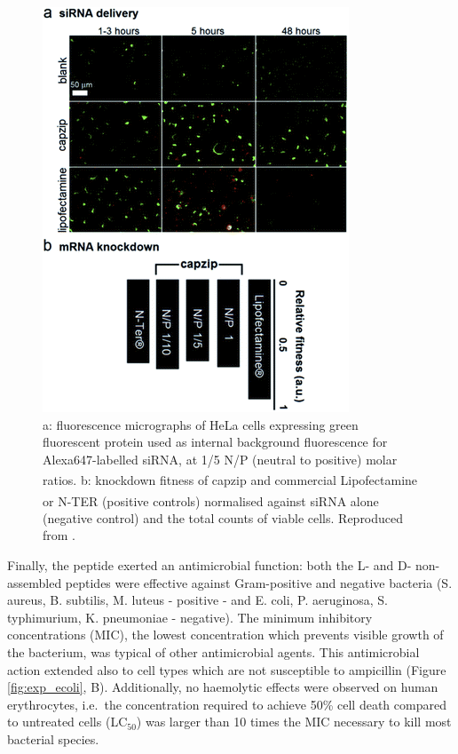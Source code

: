 \begin{figure}
\begin{center}
\includegraphics[width=0.6\linewidth, align = c]{1introduction/pics/capzip_delivery.png}
\caption[Capzip promoted RNA transfection]{a: fluorescence micrographs of HeLa cells expressing green fluorescent protein used as internal background fluorescence for Alexa647-labelled siRNA, at 1/5 N/P (neutral to positive) molar ratios. b: knockdown fitness of capzip and commercial Lipofectamine\textsuperscript{\textregistered} or N-TER\textsuperscript{\textregistered} (positive controls) normalised against siRNA alone (negative control) and the total counts of viable cells. Reproduced from \citet{Castelletto2016}.} \label{fig:exp_rna}
\end{center}
\end{figure}

Finally, the peptide exerted an antimicrobial function: both the L- and D- non-assembled peptides were effective against Gram-positive and negative bacteria (S. aureus, B. subtilis, M. luteus - positive - and E. coli, P. aeruginosa, S. typhimurium, K. pneumoniae - negative).
The minimum inhibitory concentrations (MIC), the lowest concentration which prevents visible growth of the bacterium, was typical of other antimicrobial agents. This antimicrobial action extended also to cell types which are not susceptible to ampicillin (Figure \ref{fig:exp_ecoli}, B).
%
Additionally, no haemolytic effects were observed on human erythrocytes, i.e.\ the concentration required to achieve 50\% cell death compared to untreated cells (LC$_{50}$) was larger than 10 times the MIC necessary to kill most bacterial species.

